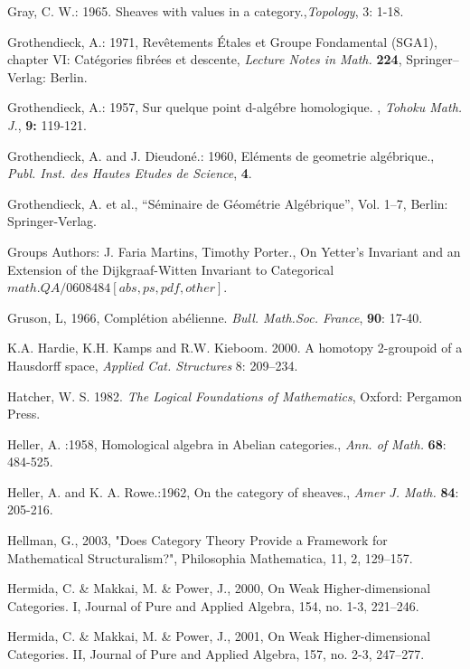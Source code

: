 \documentclass[12pt]{article}
\theoremstyle{plain}
\theoremstyle{definition}
\numberwithin{equation}{section}
\begin{document}
\begin{thebibliography}{99}
Gray, C. W.: 1965. Sheaves with values in a category.,\emph {Topology}, 3: 1-18.

Grothendieck, A.: 1971, Rev\^{e}tements \'Etales et Groupe Fondamental (SGA1),
chapter VI: Cat\'egories fibr\'ees et descente, \emph{Lecture Notes in Math.}
\textbf{224}, Springer--Verlag: Berlin.

Grothendieck, A.: 1957, Sur quelque point d-alg\'{e}bre homologique. , \emph{Tohoku Math. J.}, \textbf{9:} 119-121.

Grothendieck, A. and J. Dieudon\'{e}.: 1960, El\'{e}ments de geometrie alg\'{e}brique., \emph{Publ. Inst. des Hautes Etudes de Science}, \textbf{4}.

Grothendieck, A. et al., ``S\'eminaire de G\'eom\'etrie Alg\'ebrique'', Vol. 1--7, Berlin: Springer-Verlag.
  
Groups Authors: J. Faria Martins, Timothy Porter.,
On Yetter's Invariant and an Extension of the Dijkgraaf-Witten Invariant to Categorical
$math.QA/0608484 [abs, ps, pdf, other]$.

Gruson, L, 1966, Compl\'etion ab\'elienne. {\em Bull. Math.Soc. France}, \textbf{90}: 17-40.
 

K.A. Hardie, K.H. Kamps and R.W. Kieboom. 2000.  A homotopy 2-groupoid of a Hausdorff 
space, \emph{Applied Cat. Structures} 8: 209--234.

Hatcher, W. S. 1982. {\em The Logical Foundations of Mathematics}, Oxford: Pergamon Press. 
  
Heller, A. :1958, Homological algebra in Abelian categories., \emph{Ann. of Math.}
\textbf{68}: 484-525.

Heller, A.  and K. A. Rowe.:1962, On the category of sheaves., \emph{Amer J. Math.}
\textbf{84}: 205-216.

Hellman, G., 2003, "Does Category Theory Provide a Framework for Mathematical Structuralism?", Philosophia Mathematica, 11, 2, 129--157. 

Hermida, C. \& Makkai, M. \& Power, J., 2000, On Weak Higher-dimensional Categories. I, Journal of Pure and Applied Algebra, 154, no. 1-3, 221--246. 

Hermida, C. \& Makkai, M. \& Power, J., 2001, On Weak Higher-dimensional Categories. II, Journal of Pure and Applied Algebra, 157, no. 2-3, 247--277.  


\end{thebibliography}
\end{document}
